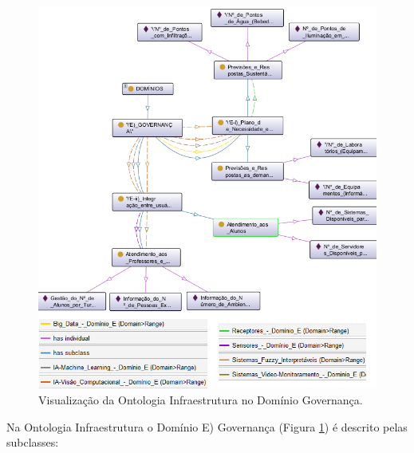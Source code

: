 \documentclass[portuguese]{textolivre}
\begin{document}
\begin{figure}[h!]
    \centering
    \includegraphics[width=0.90\linewidth]{images/FIGURA9.png}
    \caption{Visualização da Ontologia Infraestrutura no Domínio Governança.}
    \label{fig-9}
\end{figure}

Na Ontologia Infraestrutura o Domínio E) Governança (Figura \ref{fig-9}) é descrito pelas subclasses:
\end{document}
